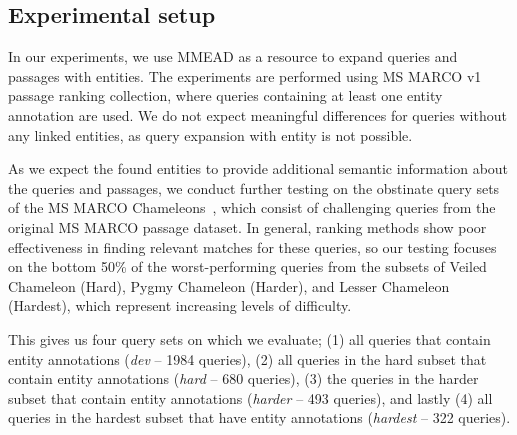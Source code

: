 
\subsection{Experimental setup}

In our experiments, we use MMEAD as a resource to expand queries and passages with entities. The experiments are performed using MS MARCO v1 passage ranking collection, where  queries containing at least one entity annotation are used. We do not expect meaningful differences for queries without any linked entities, as query expansion with entity is not possible. 

As we expect the found entities to provide additional semantic information about the queries and passages, we conduct further testing on the obstinate query sets of the MS MARCO Chameleons~\citep{chameleons}, which consist of challenging queries from the original MS MARCO passage dataset. In general, ranking methods show poor effectiveness in finding relevant matches for these queries, so our testing focuses on the bottom 50\% of the worst-performing queries from the subsets of Veiled Chameleon (Hard), Pygmy Chameleon (Harder), and Lesser Chameleon (Hardest), which represent increasing levels of difficulty. 

This gives us four query sets on which we evaluate; (1) all queries that contain entity annotations (\emph{dev} -- 1984 queries), (2) all queries in the hard subset that contain entity annotations (\emph{hard} -- 680 queries), (3) the queries in the harder subset that contain entity annotations (\emph{harder} -- 493 queries), and lastly (4) all queries in the hardest subset that have entity annotations (\emph{hardest} -- 322 queries).

